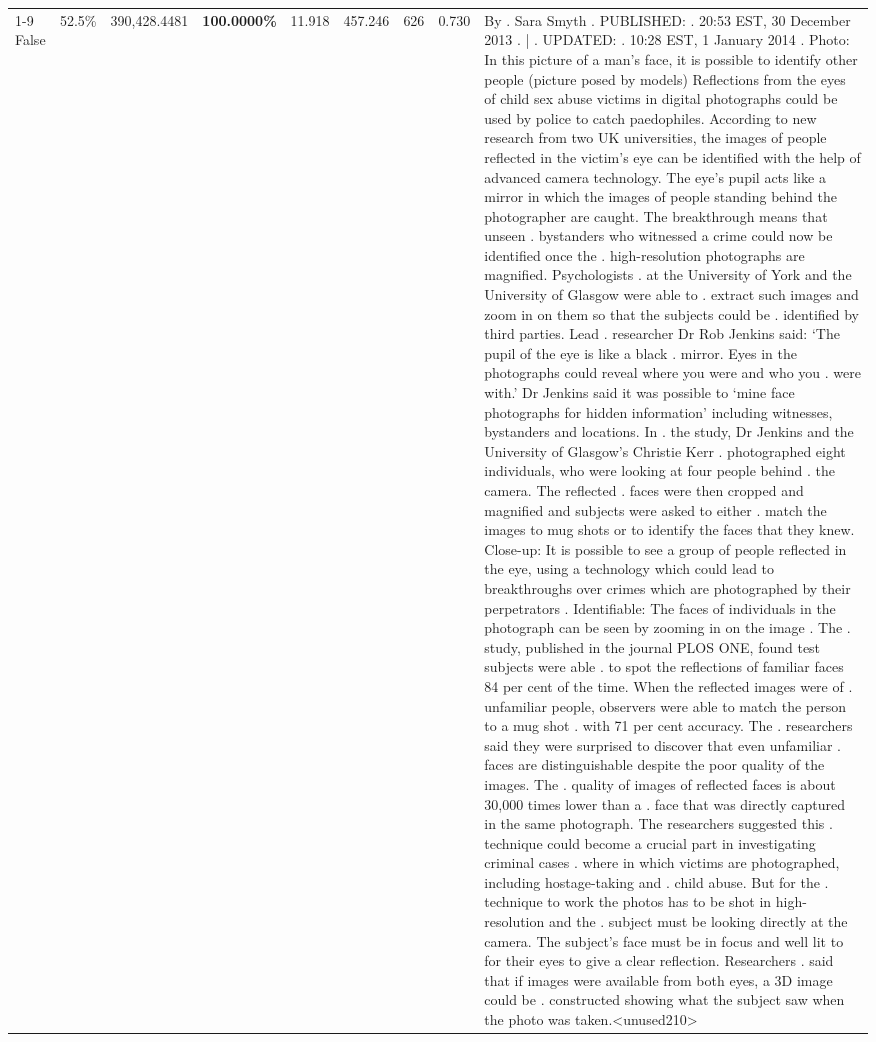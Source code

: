 \begin{table}[H]
\begin{tabular}{lllrlllll}
\cline{1-9}
False & 52.5\% & 390,428.4481 & \bfseries \color{red} 100.0000\% & 11.918 & 457.246 & 626 & 0.730 & By . Sara Smyth . PUBLISHED: . 20:53 EST, 30 December 2013 . | . UPDATED: . 10:28 EST, 1 January 2014 . Photo: In this picture of a man's face, it is possible to identify other people (picture posed by models) Reflections from the eyes of child sex abuse victims in digital photographs could be used by police to catch paedophiles. According to new research from two UK universities, the images of people reflected in the victim's eye can be identified with the help of advanced camera technology. The eye's pupil acts like a mirror in which the images of people standing behind the photographer are caught. The breakthrough means that unseen . bystanders who witnessed a crime could now be identified once the . high-resolution photographs are magnified. Psychologists . at the University of York and the University of Glasgow were able to . extract such images and zoom in on them so that the subjects could be . identified by third parties. Lead . researcher Dr Rob Jenkins said: ‘The pupil of the eye is like a black . mirror. Eyes in the photographs could reveal where you were and who you . were with.' Dr Jenkins said it was possible to ‘mine face photographs for hidden information' including witnesses, bystanders and locations. In . the study, Dr Jenkins and the University of Glasgow's Christie Kerr . photographed eight individuals, who were looking at four people behind . the camera. The reflected . faces were then cropped and magnified and subjects were asked to either . match the images to mug shots or to identify the faces that they knew. Close-up: It is possible to see a group of people reflected in the eye, using a technology which could lead to breakthroughs over crimes which are photographed by their perpetrators . Identifiable: The faces of individuals in the photograph can be seen by zooming in on the image . The . study, published in the journal PLOS ONE, found test subjects were able . to spot the reflections of familiar faces 84 per cent of the time. When the reflected images were of . unfamiliar people, observers were able to match the person to a mug shot . with 71 per cent accuracy. The . researchers said they were surprised to discover that even unfamiliar . faces are distinguishable despite the poor quality of the images. The . quality of images of reflected faces is about 30,000 times lower than a . face that was directly captured in the same photograph. The researchers suggested this . technique could become a crucial part in investigating criminal cases . where in which victims are photographed, including hostage-taking and . child abuse. But for the . technique to work the photos has to be shot in high-resolution and the . subject must be looking directly at the camera. The subject's face must be in focus and well lit to for their eyes to give a clear reflection. Researchers . said that if images were available from both eyes, a 3D image could be . constructed showing what the subject saw when the photo was taken.<unused210> \\

\end{tabular}
\end{table}
